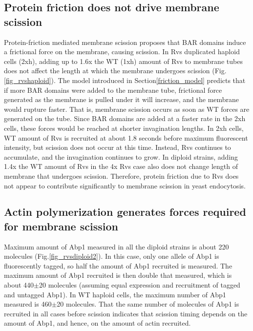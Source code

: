 \subsection{Protein friction does not drive membrane scission}
Protein-friction mediated membrane scission proposes that BAR domains induce a frictional force on the membrane, causing scission. In Rvs duplicated haploid cells (2xh), adding up to 1.6x the WT (1xh) amount of Rvs to membrane tubes does not affect the length at which the membrane undergoes scission (Fig.\ref{fig_rvshaploid}). The model introduced in Section\ref{friction_model} predicts that if more BAR domains were added to the membrane tube, frictional force generated as the membrane is pulled under it will increase, and the membrane would rupture faster. That is, membrane scission occurs as soon as WT forces are generated on the tube. Since BAR domains are added at a faster rate in the 2xh cells, these forces would be reached at shorter invagination lengths. In 2xh cells, WT amount of Rvs is recruited at about 1.8 seconds before maximum fluorescent intensity, but scission does not occur at this time. Instead, Rvs continues to accumulate, and the invagination continues to grow. In diploid strains, adding 1.4x the WT amount of Rvs in the 4x Rvs case also does not change length of membrane that undergoes scission. Therefore, protein friction due to Rvs does not appear to contribute significantly to membrane scission in yeast endocytosis. 


\subsection{ Actin polymerization generates forces required for membrane scission}
Maximum amount of Abp1 measured in all the diploid strains is about 220 molecules (Fig.\ref{fig_rvsdiploid2}). In this case, only one allele of Abp1 is fluorescently tagged, so half the amount of Abp1 recruited is measured. The maximum amount of Abp1 recruited is then double that measured, which is about 440$\pm$20 molecules (assuming equal expression and recruitment of tagged and untagged Abp1). In WT haploid cells, the maximum number of Abp1 measured is 460$\pm$20 molecules. That the same number of molecules of Abp1 is recruited in all cases before scission indicates that scission timing depends on the amount of Abp1, and hence, on the amount of actin recruited. 

